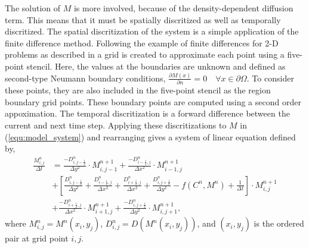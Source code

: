   The solution of $M$ is more involved, because of the density-dependent diffusion term.
  This means that it must be spatially discritized as well as temporally discritized. 
  The spatial discritization of the system is a simple application of the finite difference method.
  Following the example of finite differences for 2-D problems as described in \cite{saad2003iterativeMethod} a grid is created to approximate each point using a five-point stencil.
  Here, the values at the boundaries are unknown and defined as second-type Neumann boundary conditions, $\frac{\partial M(x)}{\partial n} = 0 \quad \forall x \in \partial \Omega$.
  To consider these points, they are also included in the five-point stencil as the region boundary grid points.
  These boundary points are computed using a second order appoximation.
  The temporal discritization is a forward difference between the current and next time step.
  Applying these discritizations to $M$ in (\ref{equ:model_system}) and rearranging gives a system of linear equation defined by,
  \begin{equation} \label{equ:discritizeM}
  \begin{aligned}
    \frac{M^n_{i,j}}{\Delta t} &= \frac{-D^n_{i,j-\frac{1}{2}}}{\Delta y ^2} \cdot M^{n+1}_{i,j-1} + \frac{-D^n_{i-\frac{1}{2},j}}{\Delta x ^2} \cdot M^{n+1}_{i-1,j}  \\
    &  +  \left[ \frac{D^n_{i,j-\frac{1}{2}}}{\Delta y ^2} + \frac{D^n_{i-\frac{1}{2},j}}{\Delta x ^2} + \frac{D^n_{i+\frac{1}{2},j}}{\Delta x ^2} + \frac{D^n_{i,j+\frac{1}{2}}}{\Delta y ^2} - f(C^n, M^n) + \frac{1}{\Delta t} \right] \cdot M^{n+1}_{i,j}  \\
    &  + \frac{-D^n_{i+\frac{1}{2},j}}{\Delta x ^2} \cdot M^{n+1}_{i+1,j} + \frac{-D^n_{i,j+\frac{1}{2}}}{\Delta y ^2} \cdot M^{n+1}_{i,j+1},
  \end{aligned}
  \end{equation} 
  where $M^n_{i,j} = M^n(x_i,y_j)$, $D^n_{i,j} = D(M^n(x_i, y_j))$, and $(x_i,y_j)$ is the ordered pair at grid point $i,j$.
  
